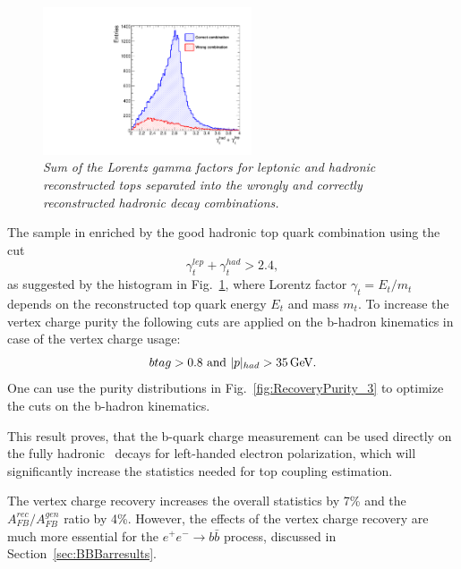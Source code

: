 \begin{figure}
	{\centering
		\includegraphics[width=0.55\textwidth]{ILD/plots/top-gamma.pdf}
		\caption{\sl Sum of the Lorentz gamma factors for leptonic and hadronic reconstructed tops separated into the wrongly and correctly reconstructed hadronic decay combinations.
		}
		\label{fig:TopGamma_3}
	}
	
\end{figure}

The sample in enriched by the good hadronic top quark combination using the cut
\begin{equation}
 \gamma^{lep}_t + \gamma^{had}_t > 2.4,
\end{equation}
 as suggested by the histogram in Fig.~\ref{fig:TopGamma_3}, where Lorentz factor $\gamma_t = E_t / m_t$ depends on the reconstructed top quark energy $E_t$ and mass $m_t$.
To increase the vertex charge purity the following cuts are applied on the b-hadron kinematics in case of the vertex charge usage:
\begin{equation}
btag > 0.8\text{ and } |p|_{had} > 35\text{\,GeV}.
\end{equation}
One can use the purity distributions in Fig.~\ref{fig:RecoveryPurity_3} to optimize the cuts on the b-hadron kinematics. 

This result proves, that the  b-quark charge measurement can be used directly on the fully hadronic \ttbar\ decays for left-handed electron polarization, which will significantly increase the statistics needed for top coupling estimation. 

The vertex charge recovery increases the overall statistics by 7\% and the $A_{FB}^{rec}/A^{gen}_{FB}$ ratio by 4\%. 
However, the effects of the vertex charge recovery are much more essential for the $e^+e^-\to b\bar{b}$ process, discussed in Section~\ref{sec:BBBarresults}.

